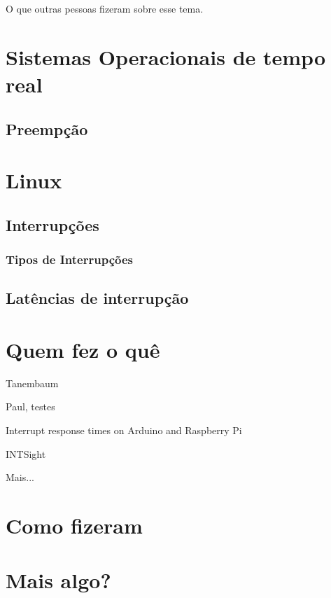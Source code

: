 
O que outras pessoas fizeram sobre esse tema.

\section{Sistemas Operacionais de tempo real}
\subsection{Preempção}
\section{Linux}
\subsection{Interrupções}
\subsubsection{Tipos de Interrupções}
\subsection{Latências de interrupção}

\section{Quem fez o quê}

Tanembaum \cite{Tanenbaum2016}

Paul, testes \cite{Regnier2008}

Interrupt response times on Arduino and Raspberry Pi \cite{Solc2016}

INTSight \cite{Gerhorst2018}

Mais...

\section{Como fizeram}
\section{Mais algo?}